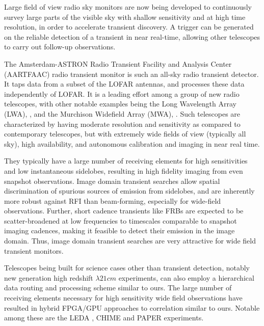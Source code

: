 \documentclass{ws-jai}
\begin{document}
Large field of  view radio sky monitors are now  being developed to continuously
survey large parts of the visible sky  with shallow sensitivity and at high time
resolution,  in order  to  accelerate  transient discovery.   A  trigger can  be
generated on the  reliable detection of a transient in  near real-time, allowing
other telescopes to carry out follow-up observations.


The  Amsterdam-ASTRON Radio  Transient Facility  and Analysis  Center (AARTFAAC)
radio transient  monitor is such  an all-sky  radio transient detector.  It taps
data from a subset of the LOFAR antennas, and processes these data independently
of LOFAR.  It  is a leading effort  among a group of new  radio telescopes, with
other   notable    examples   being    the   Long   Wavelength    Array   (LWA),
\cite{ellingsonLWA1},   and  the   Murchison   Widefield   Array  (MWA),   \cite
     {tingay2013murchison}.   Such   telescopes  are  characterized   by  having
     moderate resolution and sensitivity as compared to contemporary telescopes,
     but  with  extremely  wide  fields   of  view  (typically  all  sky),  high
     availability, and autonomous calibration and imaging in near real time.

  They  typically   have  a  large   number  of  receiving  elements   for  high
  sensitivities  and low  instantaneous  sidelobes, resulting  in high  fidelity
  imaging  from even  snapshot  observations.  Image  domain transient  searches
  allow spatial discrimination  of spurious sources of  emission from sidelobes,
  and are inherently  more robust against RFI than  beam-forming, especially for
  wide-field  observations.  Further,  short  cadence transients  like FRBs  are
  expected to be  scatter-broadened at low frequencies  to timescales comparable
  to snapshot imaging  cadences, making it feasible to detect  their emission in
  the image  domain. Thus, image  domain transient searches are  very attractive
  for wide field transient monitors.
     
  Telescopes  being built  for  science cases  other  than transient  detection,
  notably  new  generation high  redshift  $\lambda21cm$  experiments, can  also
  employ a hierarchical data routing and processing scheme similar to ours.  The
  large number of  receiving elements necessary for high  sensitivity wide field
  observations  have  resulted  in  hybrid FPGA/GPU  approaches  to  correlation
  similar to  ours.  Notable among  these are the  LEDA \citep{kocz2015digital},
  CHIME   \citep{bandura2014canadian}  and   PAPER  \citep{parsons2010precision}
  experiments.
     
\end{document}
